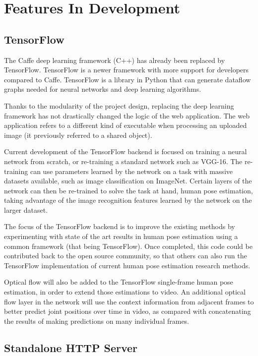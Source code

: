 \documentclass{scrreprt}
\begin{document}
\section{Features In Development}

\subsection{TensorFlow}

The Caffe deep learning framework (C++) has already been replaced by
TensorFlow. TensorFlow is a newer framework with more support for developers
compared to Caffe. TensorFlow is a library in Python that can generate dataflow
graphs needed for neural networks and deep learning algorithms.

Thanks to the modularity of the project design, replacing the deep learning
framework has not drastically changed the logic of the web application. The web
application refers to a different kind of executable when processing
an uploaded image (it previously referred to a shared object).

Current development of the TensorFlow backend is focused on training a neural
network from scratch, or re-training a standard network such as VGG-16. The
re-training can use parameters learned by the network on a task with massive
datasets available, such as image classification on ImageNet. Certain layers of
the network can then be re-trained to solve the task at hand, human pose
estimation, taking advantage of the image recognition features learned by the
network on the larger dataset.

The focus of the TensorFlow backend is to improve the existing methods by
experimenting with state of the art results in human pose estimation using a
common framework (that being TensorFlow). Once completed, this code could be
contributed back to the open source community, so that others can also run the
TensorFlow implementation of current human pose estimation research methods.

Optical flow will also be added to the TensorFlow single-frame human pose
estimation, in order to extend those estimations to video. An additional
optical flow layer in the network will use the context information from
adjacent frames to better predict joint positions over time in video, as
compared with concatenating the results of making predictions on many
individual frames.

\subsection{Standalone HTTP Server}
\end{document}
